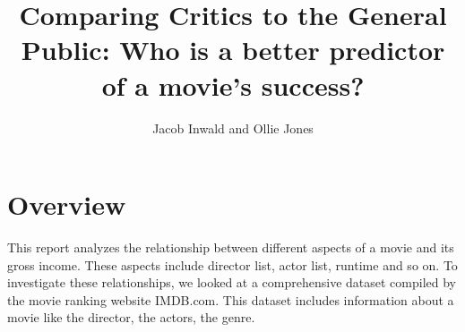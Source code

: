 \documentclass[11pt,a4paper]{article}
\title{Comparing Critics to the General Public: Who is a better predictor of a movie's success?}
\author{Jacob Inwald and Ollie Jones}
\begin{document}
\maketitle


    \section{Overview}
        This report analyzes the relationship between different aspects of a movie and
            its gross income.
        These aspects include director list, actor list, runtime and so on.
        To investigate these relationships, we looked at a comprehensive dataset
            compiled by the movie ranking website IMDB.com.
        This dataset includes information about a movie like the director, the actors,
            the genre.
\end{document}
